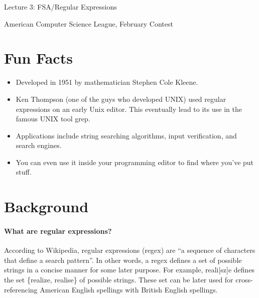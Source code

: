 \documentclass[10pt]{article}
\begin{document}
    \noindent
    \begin{center}

        \hrulefill

        \vspace{5pt}

        \vspace{0pt}

        {\Large \hfill  Lecture 3: FSA/Regular Expressions\hfill}
        \vspace{10pt}

        {\large \hfill  American Computer Science League, February Contest\hfill}
        \vspace{10pt}


        \vspace{-3pt}
        \hrulefill
    \end{center}

\section{Fun Facts}
\begin{itemize}
\item Developed in 1951 by mathematician Stephen Cole Kleene.
\item Ken Thompson (one of the guys who developed UNIX) used regular expressions on an early Unix editor.
This eventually lead to its use in the famous UNIX tool grep.
\item Applications include string searching algorithms,  input verification, and search engines.
\item You can even use it inside your programming editor to find where you've put stuff.
\end{itemize}

\section{Background}
\paragraph{What are regular expressions?}
According to Wikipedia, regular expressions (regex) are ``a sequence of characters that define a search pattern''.
In other words, a regex defines a set of possible strings in a concise manner for
some later purpose.
For example, reali[sz]e defines the set \{realize, realise\} of possible strings.
These set can be later used for cross-referencing American English spellings with British
English spellings.
\end{document}

